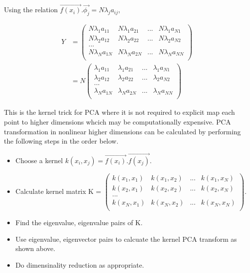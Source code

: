 \documentclass[11pt, a4paper]{article}
\begin{document}
Using the relation $\vec{f(x_i)}.\vec{\phi_j} = N\lambda_j a_{ij}$,

\begin{align*}
	Y &= \begin{pmatrix}
	N\lambda_1 a_{11} & N\lambda_1 a_{21} & ... & N\lambda_1 a_{N1} \\ 
	N\lambda_2 a_{12} & N\lambda_2 a_{22} & ... & N\lambda_2 a_{N2} \\ 
	... \\
	N\lambda_N a_{1N} & N\lambda_N a_{2N} & ... & N\lambda_N a_{NN} \\ 
	\end{pmatrix} \\
	&=  N\begin{pmatrix}
	\lambda_1 a_{11}  & \lambda_1 a_{21}  & ... & \lambda_1 a_{N1}  \\ 
	\lambda_2 a_{12}  & \lambda_2 a_{22}  & ... & \lambda_2 a_{N2}  \\ 
	... \\
	\lambda_N a_{1N}  & \lambda_N a_{2N}  & ... & \lambda_N a_{NN}  \\ 
	\end{pmatrix}      
\end{align*} 

This is the kernel trick for PCA where it is not required to explicit map each point to higher dimensions whcich may be computationally expensive. PCA transformation in nonlinear higher dimensions can be calculated by performing the following steps in the order below. 

\begin{itemize}
	\item Choose a kernel $ k(x_i, x_j) = \vec{f(x_i)}.\vec{f(x_j)}$.
	\item Calculate kernel matrix K = $\begin{pmatrix}
	      k(x_1, x_1) & k(x_1, x_2) & ... & k(x_1, x_N) \\
	      k(x_2, x_1) & k(x_2, x_2) & ... & k(x_2, x_N) \\
	      ... \\
	      k(x_N, x_1) & k(x_N, x_2) & ... & k(x_N, x_N) \\
	\end{pmatrix}$.
	\item Find the eigenvalue, eigenvalue pairs of K.
	\item Use eigenvalue, eigenvector pairs to calcuate the kernel PCA transform as shown above.
	\item Do dimensinality reduction as appropriate.  
\end{itemize}
\end{document}
